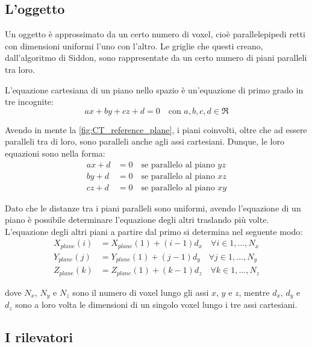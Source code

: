 \documentclass[12pt,a4paper]{report}
\begin{document}
\subsection{L'oggetto}

Un oggetto è approssimato da un certo numero di voxel, cioè parallelepipedi retti con dimensioni uniformi l'uno con l'altro.
Le griglie che questi creano, dall'algoritmo di Siddon, sono rappresentate da un certo numero di piani paralleli tra loro.

L'equazione cartesiana di un piano nello spazio è un'equazione di primo grado in tre incognite:
\begin{equation*}
  ax + by + cz + d = 0 \quad \text{con } a, b, c, d \in \Re
\end{equation*}

Avendo in mente la \autoref{fig:CT_reference_plane}, i piani coinvolti, oltre che ad essere paralleli tra di loro, sono paralleli
anche agli assi cartesiani.
Dunque, le loro equazioni sono nella forma:
\begin{align*}
  ax + d &= 0 \quad \text{se parallelo al piano } yz \\
  by + d &= 0 \quad \text{se parallelo al piano } xz \\
  cz + d &= 0 \quad \text{se parallelo al piano } xy
\end{align*}

Dato che le distanze tra i piani paralleli sono uniformi, avendo l'equazione di un piano è possibile determinare l'equazione degli
altri traslando più volte.
L'equazione degli altri piani a partire dal primo si determina nel seguente modo:
\begin{align*}
  X_{plane}(i) &= X_{plane}(1) + (i - 1) d_x \quad \forall i \in 1, \dots, N_x \\
  Y_{plane}(j) &= Y_{plane}(1) + (j - 1) d_y \quad \forall j \in 1, \dots, N_y \\
  Z_{plane}(k) &= Z_{plane}(1) + (k - 1) d_z \quad \forall k \in 1, \dots, N_z
\end{align*}

dove \(N_x\), \(N_y\) e \(N_z\) sono il numero di voxel lungo gli assi \(x\), \(y\) e \(z\), mentre \(d_x\), \(d_y\) e \(d_z\)
sono a loro volta le dimensioni di un singolo voxel lungo i tre assi cartesiani.

\subsection{I rilevatori} \label{subsec:pixels}
\end{document}
